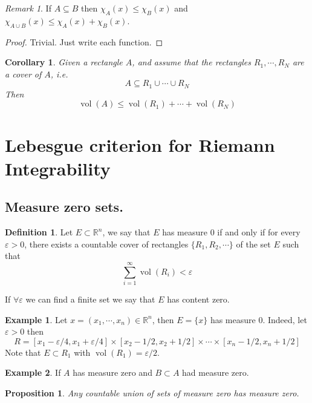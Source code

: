 \documentclass[11pt,openany]{book}
\theoremstyle{plain}
\newtheorem{corollary}{Corollary}[chapter]
\newtheorem{proposition}{Proposition}[chapter]
\theoremstyle{definition}
\newtheorem{definition}{Definition}[chapter]
\newtheorem{example}{Example}[chapter]
\theoremstyle{remark}
\newtheorem{remark}{Remark}[chapter]
\newcommand{\R}{\mathbb{R}}
\newcommand{\set}[1]{\{ #1 \}}
\newcommand{\vol}{\operatorname{vol}}
\begin{document}
\begin{remark}
    If $A \subseteq B$ then $\chi_A(x) \le \chi_B(x)$ and $\chi_{A \cup B} (x) \le \chi_A (x) + \chi_B(x)$.
\end{remark}

\begin{proof}
    Trivial. Just write each function.
\end{proof}

\begin{corollary}
    Given a rectangle $A$, and assume that the rectangles $R_1, \cdots, R_N$ are a cover of $A$, i.e. 
    $$A \subseteq R_1 \cup \cdots \cup R_N$$
    Then 
    $$\vol(A) \le \vol(R_1) + \cdots + \vol (R_N)$$
\end{corollary}

\section{Lebesgue criterion for Riemann Integrability}

\subsection{Measure zero sets.} 
\begin{definition}
    Let $E \subset \R^n$, we say that $E$ has measure $0$ if and only if for every $\varepsilon > 0$, there exists a 
    countable cover of rectangles $\set{R_1, R_2, \cdots}$ of the set $E$ such that 
    $$\sum_{i=1}^\infty \vol(R_i) < \varepsilon$$

    If $\forall \varepsilon$ we can find a finite set we say that $E$ has content zero.
\end{definition}

\begin{example}
    Let $x = (x_1, \cdots, x_n)\in \R^n$, then $E = \set{x}$ has measure $0$. 
    Indeed, let $\varepsilon > 0$ then 
    $$R = [x_1 - \varepsilon/4, x_1 + \varepsilon/4] \times [x_2 - 1/2, x_2 + 1/2] \times \cdots \times [x_n-1/2, x_n + 1/2]$$
    Note that $E \subset R_1$ with $\vol (R_1) = \varepsilon/2$. 
\end{example}

\begin{example}
    If $A$ has measure zero and $B \subset A$ had measure zero.
\end{example}

\begin{proposition}
    Any countable union of sets of measure zero has measure zero.
\end{proposition}
\end{document}
